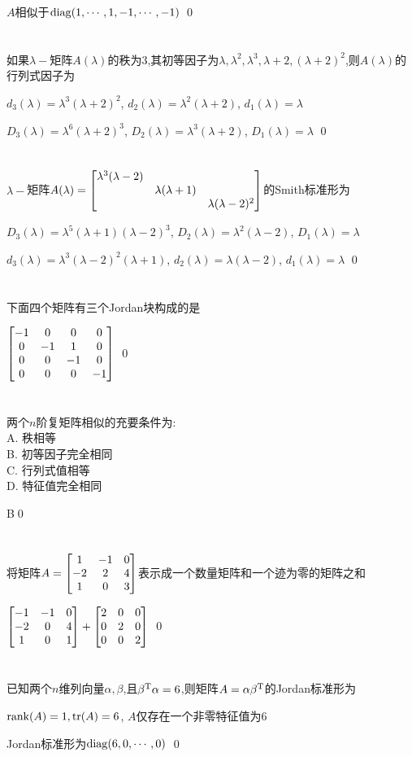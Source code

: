 \documentclass{matrix-homework}
\newcommand{\la}{\lambda}
\begin{document}
$A$相似于$\mathrm{diag}(1,\cdots,1,-1,\cdots,-1)$
\qed

\section{}
如果$\la-$矩阵$A(\la)$的秩为3,其初等因子为$\la,\la^2,\la^3,\la+2,(\la+2)^2$,则$A(\la)$的行列式因子为

\answer
$d_3(\la)=\la^3(\la+2)^2$, $d_2(\la)=\la^2(\la+2)$, $d_1(\la)=\la$

$D_3(\la)=\la^6(\la+2)^3$, $D_2(\la)=\la^3(\la+2)$, $D_1(\la)=\la$
\qed

\section{}
$\la-$矩阵$A(\la)=\mat{\la^3(\la-2) \\ & \la(\la+1) \\ && \la(\la-2)^2}$的Smith标准形为

\answer
$D_3(\la)=\la^5(\la+1)(\la-2)^3$, $D_2(\la)=\la^2(\la-2)$, $D_1(\la)=\la$

$d_3(\la)=\la^3(\la-2)^2(\la+1)$, $d_2(\la)=\la(\la-2)$, $d_1(\la)=\la$
\qed

\section{}
下面四个矩阵有三个Jordan块构成的是

\answer
$\begin{bmatrix}-1 & 0 & 0 & 0 \\ 0 & -1 & 1 & 0 \\ 0 & 0 & -1 & 0 \\ 0 & 0 & 0 & -1\end{bmatrix}$
\qed

\section{}
两个$n$阶复矩阵相似的充要条件为:
\\A. 秩相等
\\B. 初等因子完全相同
\\C. 行列式值相等
\\D. 特征值完全相同

\answer
B\qed

\section{}
将矩阵$A=\begin{bmatrix}1 & -1 & 0 \\ -2 & 2 & 4 \\ 1 & 0 & 3\end{bmatrix}$表示成一个数量矩阵和一个迹为零的矩阵之和

\answer
$\begin{bmatrix}-1 & -1 & 0 \\ -2 & 0 & 4 \\ 1 & 0 & 1\end{bmatrix} + \begin{bmatrix}2 & 0 & 0 \\ 0 & 2 & 0 \\ 0 & 0 & 2\end{bmatrix}$
\qed

\section{}
已知两个$n$维列向量$\alpha,\beta$,且$\beta^{\mathrm{T}}\alpha=6$,则矩阵$A=\alpha\beta^{\mathrm{T}}$的Jordan标准形为

\answer
$\mathrm{rank}(A)=1,\mathrm{tr}(A)=6$, $A$仅存在一个非零特征值为$6$

Jordan标准形为$\mathrm{diag}(6,0,\cdots,0)$
\qed
\end{document}
